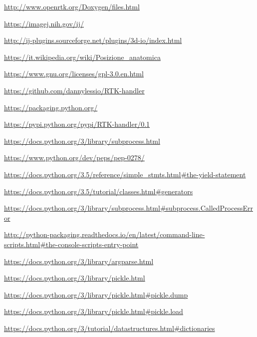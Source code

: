\documentclass[a4paper,12pt, doubleside]{report}
\begin{document}
\begin{thebibliography}{1}
        \url{http://www.openrtk.org/Doxygen/files.html}
    
        \url{https://imagej.nih.gov/ij/}
        
        \url{http://ij-plugins.sourceforge.net/plugins/3d-io/index.html}
        
        \url{https://it.wikipedia.org/wiki/Posizione_anatomica}



        \url{https://www.gnu.org/licenses/gpl-3.0.en.html}

        \url{https://github.com/dannylessio/RTK-handler}

        \url{https://packaging.python.org/}
        
        \url{https://pypi.python.org/pypi/RTK-handler/0.1}

        \url{https://docs.python.org/3/library/subprocess.html}    

        \url{https://www.python.org/dev/peps/pep-0278/}

        \url{https://docs.python.org/3.5/reference/simple_stmts.html#the-yield-statement}

        \url{https://docs.python.org/3.5/tutorial/classes.html#generators}

        \url{https://docs.python.org/3/library/subprocess.html#subprocess.CalledProcessError}

        \url{http://python-packaging.readthedocs.io/en/latest/command-line-scripts.html#the-console-scripts-entry-point}

        \url{https://docs.python.org/3/library/argparse.html}

        \url{https://docs.python.org/3/library/pickle.html}
    
        \url{https://docs.python.org/3/library/pickle.html#pickle.dump}
    
        \url{https://docs.python.org/3/library/pickle.html#pickle.load}
    
        \url{https://docs.python.org/3/tutorial/datastructures.html#dictionaries}


\end{thebibliography}
\end{document}
